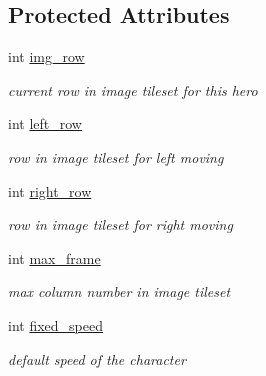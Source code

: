 \subsection*{Protected Attributes}
\begin{DoxyCompactItemize}
\item 
\mbox{\label{class_player_a07824bd51e3fb726f481c1e5f3e695a6}} 
int \hyperlink{class_player_a07824bd51e3fb726f481c1e5f3e695a6}{img\+\_\+row}
\begin{DoxyCompactList}\small\item\em current row in image tileset for this hero \end{DoxyCompactList}\item 
\mbox{\label{class_player_a336d4b7a8eb04bcffcfe62a69f8bff52}} 
int \hyperlink{class_player_a336d4b7a8eb04bcffcfe62a69f8bff52}{left\+\_\+row}
\begin{DoxyCompactList}\small\item\em row in image tileset for left moving \end{DoxyCompactList}\item 
\mbox{\label{class_player_a68fd86a5c42d0619eff999228b0be898}} 
int \hyperlink{class_player_a68fd86a5c42d0619eff999228b0be898}{right\+\_\+row}
\begin{DoxyCompactList}\small\item\em row in image tileset for right moving \end{DoxyCompactList}\item 
\mbox{\label{class_player_a2eee5f54a0b42e1a98045ddbe25a75ca}} 
int \hyperlink{class_player_a2eee5f54a0b42e1a98045ddbe25a75ca}{max\+\_\+frame}
\begin{DoxyCompactList}\small\item\em max column number in image tileset \end{DoxyCompactList}\item 
\mbox{\label{class_player_a879ea860c2b4f99dada44ae8672aeeb1}} 
int \hyperlink{class_player_a879ea860c2b4f99dada44ae8672aeeb1}{fixed\+\_\+speed}
\begin{DoxyCompactList}\small\item\em default speed of the character \end{DoxyCompactList}\item 

\end{DoxyCompactItemize}
